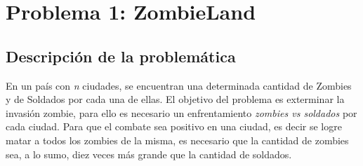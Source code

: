 \documentclass[a4paper]{article}
\begin{document}
\thispagestyle{empty}


\maketitle
\newpage

\thispagestyle{empty}
\vfill
\begin{abstract}
Habi\'endonos sido dado una serie de tres problem\'aticas a resolver, se plantean sus respectivas soluciones acorde a los requisitos pedidos. Se adjunta una descripci\'on de cada problema y su soluci\'on, conjunto a su an\'alisis de correctitud y de complejidad sumado a su experimentaci\'on. El lenguaje elegido para llevar a cabo el trabajo es C++.

Estos son los comandos para compilar cada ejercicio (el flag se utiliz\'o para la librer\'ia <chrono> para medir tiempos de ejecucion):\\
	g++ -o main Zombieland.cpp -std=c++11\\
	g++ -o main AltaFrecuencia.cpp -std=c++11\\
	g++ -o main SenorCaballos.cpp -std=c++11
	
Dentro de cada .cpp est\'a el comando para compilar cada ejercicio desde la carpeta donde se encuentran los mismos.

\end{abstract}

\thispagestyle{empty}
\vspace{3cm}
\tableofcontents
\newpage


\newpage

\section{Problema 1: ZombieLand}

\subsection{Descripci\'on de la problem\'atica}

En un pa\'is con \emph{n} ciudades, se encuentran una determinada cantidad de Zombies y de Soldados por cada una de ellas. El objetivo del problema es exterminar la invasi\'on zombie, para ello es necesario un enfrentamiento \textit{zombies vs soldados} por cada ciudad. Para que el combate sea positivo en una ciudad, es decir se logre matar a todos los zombies de la misma, es necesario que la cantidad de zombies sea, a lo sumo, diez veces m\'as grande que la cantidad de soldados.\\
\end{document}
